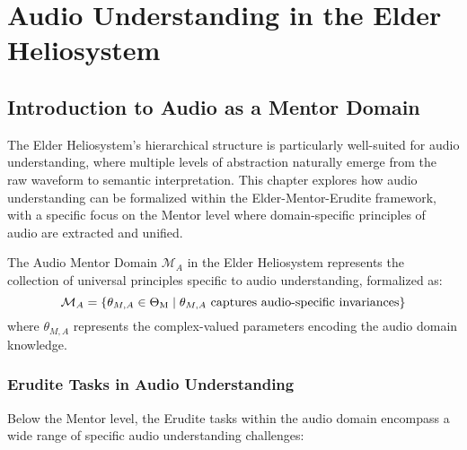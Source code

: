 \chapter{Audio Understanding in the Elder Heliosystem}

\section{Introduction to Audio as a Mentor Domain}

The Elder Heliosystem's hierarchical structure is particularly well-suited for audio understanding, where multiple levels of abstraction naturally emerge from the raw waveform to semantic interpretation. This chapter explores how audio understanding can be formalized within the Elder-Mentor-Erudite framework, with a specific focus on the Mentor level where domain-specific principles of audio are extracted and unified.

\begin{definition}
The Audio Mentor Domain $\mathcal{M}_A$ in the Elder Heliosystem represents the collection of universal principles specific to audio understanding, formalized as:
\begin{equation}
\mathcal{M}_A = \{\theta_{M,A} \in \Theta_{\text{M}} \mid \theta_{M,A} \text{ captures audio-specific invariances}\}
\end{equation}
where $\theta_{M,A}$ represents the complex-valued parameters encoding the audio domain knowledge.
\end{definition}

\subsection{Erudite Tasks in Audio Understanding}

Below the Mentor level, the Erudite tasks within the audio domain encompass a wide range of specific audio understanding challenges:

